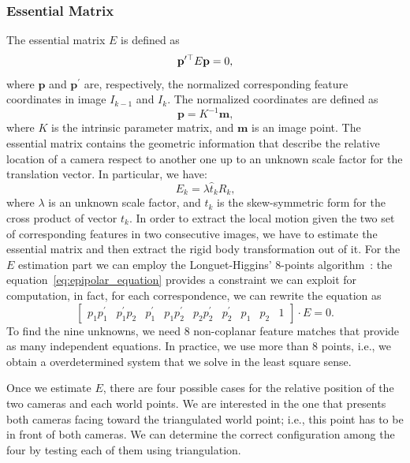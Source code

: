 \subsubsection{Essential Matrix}
\label{subsec:essential_matrix}
The essential matrix $E$ is defined as
%
\begin{equation}
\label{eq:epipolar_equation}
	\mathbf{p}^{\prime\top} E \mathbf{p} = 0 \text{,}
\end{equation}
%
\noindent where $\mathbf{p}$ and $\mathbf{p}^\prime$ are, respectively, the normalized corresponding 
feature coordinates in image $I_{k-1}$ and $I_{k}$. The normalized coordinates are defined as
%
\begin{equation}
	\mathbf{p} = K^{-1} \mathbf{m} \text{,}
\end{equation}
%
\noindent where $K$ is the intrinsic parameter matrix, and $\mathbf{m}$ is an
image point.
The essential matrix contains the geometric information that describe the 
relative location of a camera respect to another one up to an unknown scale factor 
for the translation vector. In particular, we have:
\begin{equation*}
	E_k = \lambda \hat{t}_kR_k \text{,}
\end{equation*}
\noindent where $\lambda$ is an unknown scale factor, and $\hat{t}_k$ is 
the skew-symmetric form for the cross product of vector $t_k$.
In order to extract the local motion given the two set of corresponding features
in two consecutive images, we have to estimate the essential matrix and then 
extract the rigid body transformation out of it.
For the $E$ estimation part we can employ the Longuet-Higgins' 8-points 
algorithm~\cite{longuet1981computer}: the equation~\ref{eq:epipolar_equation} 
provides a constraint we
can exploit for computation, in fact, for each correspondence, we can rewrite 
the equation as
%
\begin{equation*}
	\begin{bmatrix}
		p_1p^\prime_1 & 
        p^\prime_1p_2 & 
        p^\prime_1 & 
        p_1p^\prime_2 & 
        p_2p^\prime_2 & 
        p^\prime_2 & 
        p_1 & p_2 & 
        1
	\end{bmatrix} 
    \cdot
	E = 0	\text{.}
\end{equation*}
%
To find the nine unknowns, we need 8 non-coplanar feature matches that provide as many 
independent equations. In practice, we use more than 8 points, i.e., we obtain a overdetermined 
system that we solve in the least square sense.

Once we estimate $E$, there are four possible cases for the relative 
position of the two cameras and each world points. We are interested in the one
that presents both cameras facing toward the triangulated world point; i.e., this point has to be in front of both cameras. We can determine the correct configuration among the four by testing each of them using triangulation.

